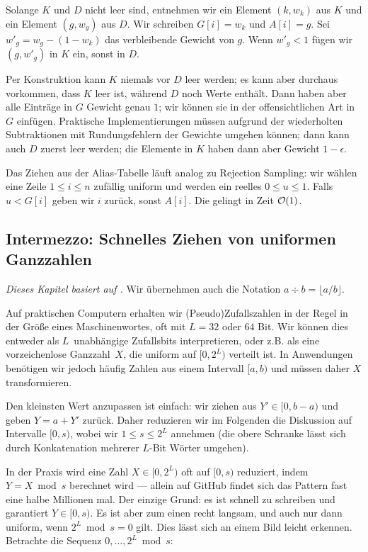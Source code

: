 Solange $K$ und $D$ nicht leer sind, entnehmen wir ein Element $(k, w_k)$ aus $K$ und ein Element $(g, w_g)$ aus $D$.
Wir schreiben $G[i] = w_k$ und $A[i] = g$.
Sei $w'_g = w_g - (1 - w_k)$ das verbleibende Gewicht von $g$.
Wenn $w'_g < 1$ fügen wir $(g, w'_g)$ in $K$ ein, sonst in $D$.

Per Konstruktion kann $K$ niemals vor $D$ leer werden; es kann aber durchaus vorkommen, dass $K$ leer ist, während $D$ noch Werte enthält.
Dann haben aber alle Einträge in $G$ Gewicht genau $1$; wir können sie in der offensichtlichen Art in $G$ einfügen.
Praktische Implementierungen müssen aufgrund der wiederholten Subtraktionen mit Rundungsfehlern der Gewichte umgehen können;
dann kann auch $D$ zuerst leer werden; die Elemente in $K$ haben dann aber Gewicht $1 - \epsilon$.

Das Ziehen aus der Alias-Tabelle läuft analog zu Rejection Sampling:
wir wählen eine Zeile $1 \le i \le n$ zufällig uniform und werden ein reelles $0 \le u \le 1$.
Falls $u < G[i]$ geben wir $i$ zurück, sonst $A[i]$.
Die gelingt in Zeit $\mathcal{O}\!\left(1\right)$.

\subsection{Intermezzo: Schnelles Ziehen von uniformen Ganzzahlen}\label{subsec:uniforme_ganzzahlen}
\emph{Dieses Kapitel basiert auf \cite{DBLP:journals/tomacs/Lemire19}.}
Wir übernehmen auch die Notation $a \div b = \lfloor a / b \rfloor$.

\bigskip

Auf praktischen Computern erhalten wir (Pseudo)Zufallszahlen in der Regel in der Größe eines Maschinenwortes, oft mit $L = 32$ oder $64$ Bit.
Wir können dies entweder als $L$~unabhängige Zufallsbits interpretieren, oder z.B. als eine vorzeichenlose Ganzzahl~$X$, die uniform auf $[0, 2^L)$ verteilt ist.
In Anwendungen benötigen wir jedoch häufig Zahlen aus einem Intervall $[a, b)$ und müssen daher $X$ transformieren.

Den kleinsten Wert anzupassen ist einfach: wir ziehen aus $Y' \in [0, b-a)$ und geben $Y = a + Y'$ zurück.
Daher reduzieren wir im Folgenden die Diskussion auf Intervalle $[0, s)$, wobei wir $1 \le s \le 2^L$ annehmen (die obere Schranke lässt sich durch Konkatenation mehrerer $L$-Bit Wörter umgehen).

In der Praxis wird eine Zahl $X \in [0, 2^L)$ oft auf $[0, s)$ reduziert, indem $Y = X \bmod s$ berechnet wird
--- allein auf GitHub findet sich das Pattern  fast eine halbe Millionen mal.
Der einzige Grund: es ist schnell zu schreiben und garantiert $Y \in [0, s)$.
Es ist aber zum einen recht langsam, und auch nur dann uniform, wenn $2^L \bmod s = 0$ gilt.
Dies lässt sich an einem Bild leicht erkennen.
Betrachte die Sequenz $0, \ldots, 2^L \bmod s$:

